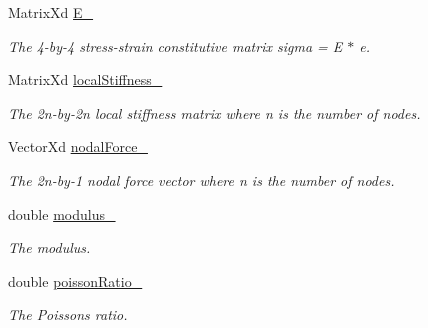 \begin{DoxyCompactItemize}
\mbox{\label{class_element_a8d60170ba5c9254692a54cfad717ffa9}} 
Matrix\+Xd \mbox{\hyperlink{class_element_a8d60170ba5c9254692a54cfad717ffa9}{E\+\_\+}}
\begin{DoxyCompactList}\small\item\em The 4-\/by-\/4 stress-\/strain constitutive matrix sigma = E $\ast$ e. \end{DoxyCompactList}\item 
\mbox{\label{class_element_aa784e074cb93a9731f279c91f68e6beb}} 
Matrix\+Xd \mbox{\hyperlink{class_element_aa784e074cb93a9731f279c91f68e6beb}{local\+Stiffness\+\_\+}}
\begin{DoxyCompactList}\small\item\em The 2n-\/by-\/2n local stiffness matrix where n is the number of nodes. \end{DoxyCompactList}\item 
\mbox{\label{class_element_a98da964a6e07b9deb00b170b6d9d954d}} 
Vector\+Xd \mbox{\hyperlink{class_element_a98da964a6e07b9deb00b170b6d9d954d}{nodal\+Force\+\_\+}}
\begin{DoxyCompactList}\small\item\em The 2n-\/by-\/1 nodal force vector where n is the number of nodes. \end{DoxyCompactList}\item 
\mbox{\label{class_element_a48f40fd0d2c4f4aeba3f2a58ccbe5b2d}} 
double \mbox{\hyperlink{class_element_a48f40fd0d2c4f4aeba3f2a58ccbe5b2d}{modulus\+\_\+}}
\begin{DoxyCompactList}\small\item\em The modulus. \end{DoxyCompactList}\item 
\mbox{\label{class_element_abb1803330550aea8123fa12dc1317f4e}} 
double \mbox{\hyperlink{class_element_abb1803330550aea8123fa12dc1317f4e}{poisson\+Ratio\+\_\+}}
\begin{DoxyCompactList}\small\item\em The Poisson\textquotesingle{}s ratio. \end{DoxyCompactList}\item 
\mbox{\label{class_element_a95aee59c87f4d17911332c0309eae425}} 

\end{DoxyCompactItemize}
